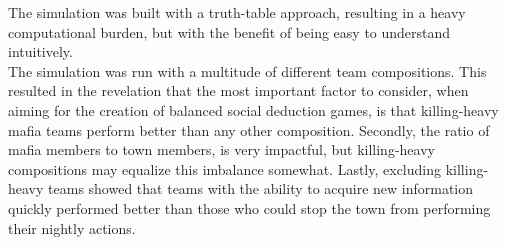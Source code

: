 The simulation was built with a truth-table approach, resulting in a heavy
computational burden, but with the benefit of being easy to understand
intuitively. \\
The simulation was run with a multitude of different team compositions. This
resulted in the revelation that the most important factor to consider, when
aiming for the creation of balanced social deduction games, is that killing-heavy mafia teams perform better than any other composition. Secondly, the ratio of mafia members to town members, is very impactful, but killing-heavy compositions may equalize this imbalance somewhat. Lastly, excluding killing-heavy teams showed that teams with the ability to acquire new information quickly performed better than those who could stop the town from performing their nightly actions.\\
\twocolumn